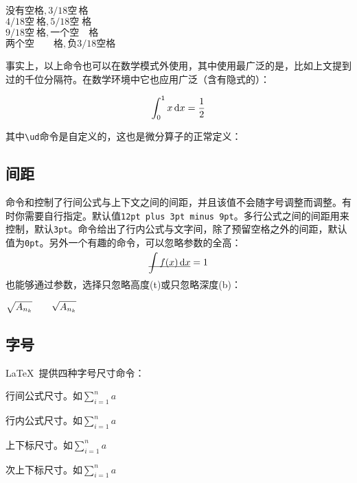 \begin{codeshow}
  $没有空格,3/18空\,格$ \\
  $4/18空\:格,5/18空\;格$ \\
  $9/18空\ 格,一个空\quad 格$ \\
  $两个空\qquad 格,负3/18空\!格$
\end{codeshow}

事实上，以上命令也可以在数学模式外使用，其中使用最广泛的是\latexline{,}，比如上文提到过的千位分隔符。在数学环境中它也应用广泛（含有隐式的\latexline{,}）：

\begin{codeshow}
\[ \int_0^1 x \ud{}x
= \frac{1}{2} \]
\end{codeshow}

其中\verb|\ud|命令是自定义的，这也是微分算子的正常定义\label{cmd:ud}：
\begin{latex}
\newcommand{\ud}{\mathop{}\negthinspace\mathrm{d}}
\end{latex}

\subsection{间距}
命令和控制了行间公式与上下文之间的间距，并且该值不会随字号调整而调整。有时你需要自行指定。默认值\texttt{12pt plus 3pt minus 9pt}。多行公式之间的间距用来控制，默认\texttt{3pt}。命令给出了行内公式与文字间，除了预留空格之外的间距，默认值为\texttt{0pt}。另外一个有趣的命令，可以忽略参数的全高：
\begin{codeshow}
\[\underline{\smash{\int f(x)\ud x}}=1\]
\end{codeshow}

也能够通过参数，选择只忽略高度(t)或只忽略深度(b)：
\begin{codeshow}
$\sqrt{A_{n_k}} \qquad
\sqrt{\smash[b]{A_{n_k}}}$
\end{codeshow}

\subsection{字号}
\LaTeX\ 提供四种字号尺寸命令：
\begin{para}
\item[\latexline{displaystyle}] 行间公式尺寸。如$\displaystyle \sum_{i=1}^n a$
\item[\latexline{textstyle}] 行内公式尺寸。如$\textstyle \sum_{i=1}^n a$
\item[\latexline{scriptstyle}] 上下标尺寸。如$\scriptstyle \sum_{i=1}^n a$
\item[\latexline{scriptscriptstyle}] 次上下标尺寸。如$\scriptscriptstyle \sum_{i=1}^n a$
\end{para}

